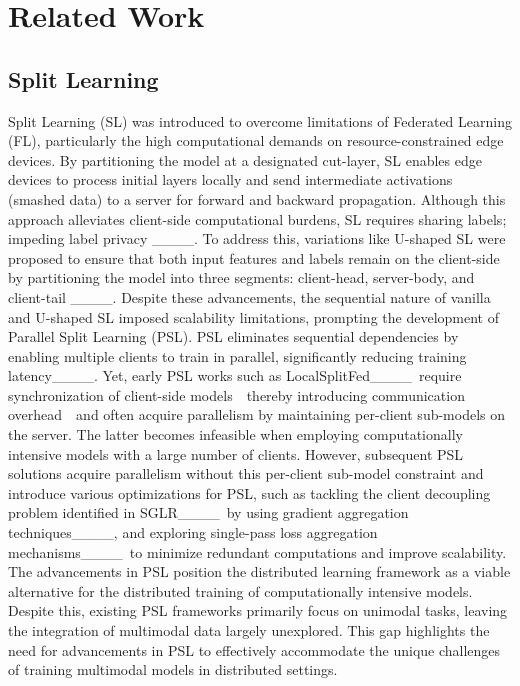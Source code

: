 \section{Related Work}
\label{related_work}

\subsection{Split Learning}
Split Learning (SL) was introduced to overcome limitations of Federated Learning (FL), particularly the high computational demands on resource-constrained edge devices. By partitioning the model at a designated cut-layer, SL enables edge devices to process initial layers locally and send intermediate activations (smashed data) to a server for forward and backward propagation. Although this approach alleviates client-side computational burdens, SL requires sharing labels; impeding label privacy ____. To address this, variations like U-shaped SL were proposed to ensure that both input features and labels remain on the client-side by partitioning the model into three segments: client-head, server-body, and client-tail ____. Despite these advancements, the sequential nature of vanilla and U-shaped SL imposed scalability limitations, prompting the development of Parallel Split Learning (PSL). PSL eliminates sequential dependencies by enabling multiple clients to train in parallel, significantly reducing training latency____. Yet, early PSL works such as LocalSplitFed____~require synchronization of client-side models~\textendash~thereby introducing communication overhead~\textendash~and often acquire parallelism by maintaining per-client sub-models on the server. The latter becomes infeasible when employing computationally intensive models with a large number of clients. However, subsequent PSL solutions acquire parallelism without this per-client sub-model constraint and introduce various optimizations for PSL, such as tackling the client decoupling problem identified in SGLR____~by using gradient aggregation techniques____, and exploring single-pass loss aggregation mechanisms____~to minimize redundant computations and improve scalability. The advancements in PSL position the distributed learning framework as a viable alternative for the distributed training of computationally intensive models. Despite this, existing PSL frameworks primarily focus on unimodal tasks, leaving the integration of multimodal data largely unexplored. This gap highlights the need for advancements in PSL to effectively accommodate the unique challenges of training multimodal models in distributed settings.

